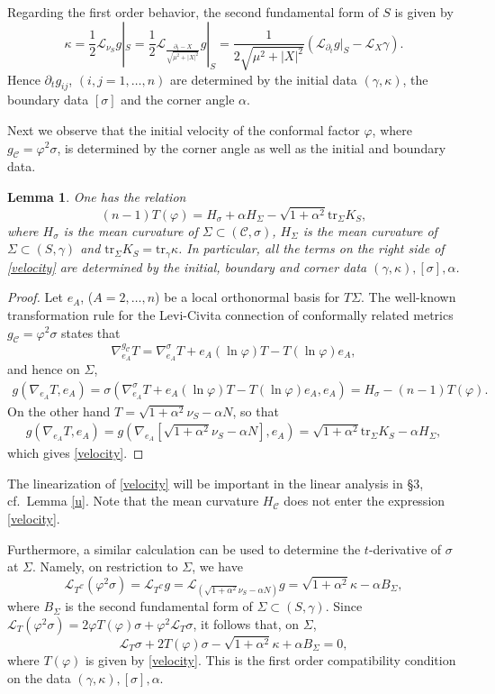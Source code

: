 \documentclass[10pt]{amsart}
\renewcommand{\a}{\alpha}
\newcommand{\g}{\gamma}
\newcommand{\f}{\varphi}
\newcommand{\s}{\sigma}
\newcommand{\Si}{\Sigma}
\renewcommand{\k}{\kappa}
\newcommand{\cC}{{\mathcal C}}
\newcommand{\cL}{{\mathcal L}}
\newcommand{\be}{\begin{equation}}
\newcommand{\ee}{\end{equation}}
\newcommand{\bes}{\begin{equation*}}
\newcommand{\ees}{\end{equation*}}
\newcommand{\tr}{\mathrm{tr}}
\newcommand{\p}{\partial}
\newcommand{\<}{\langle}
\renewcommand{\>}{\rangle}
\theoremstyle{plain}
\newtheorem{lemma}{Lemma}[section]
\theoremstyle{remark}
\theoremstyle{definition}
\numberwithin{equation}{section}
\begin{document}
\medskip

Regarding the first order behavior, the second fundamental form of $S$ is given by  
\be\label{pt-K}
\k = \frac{1}{2}\cL_{\nu_S} g|_S=\frac{1}{2}\cL_{\frac{\p_t-X}{\sqrt{\mu^2+|X|^2}}}g|_S=\frac{1}{2\sqrt{\mu^2+|X|^2}}(\cL_{\p_{t}}g|_S-\cL_{X}\g).
\ee
Hence $\p_t g_{ij}$, $(i, j =1, \dots, n)$ are determined by the initial data $(\g, \k)$, the boundary data $[\s]$ and the corner angle $\a$. 
 
 Next we observe that the initial velocity of the conformal factor $\f$, where $g_{\cC} = \f^2 \s$, is determined by the corner angle as well as the initial and 
boundary data. 

\begin{lemma} \label{cornerlemma}
One has the relation
\be \label{velocity}
(n-1)T(\f) = H_{\s} + \a H_{\Si} - \sqrt{1+\a^2}\tr_\Si K_S, 
\ee 
where $H_\s$ is the mean curvature of $\Si\subset (\cC,\s)$, $H_{\Si}$ is the mean curvature of $\Si \subset (S, \g)$ and 
$\tr_{\Si}K_S = \tr_{\g}\k$. In particular, all the terms on the right side of \eqref{velocity} are determined by the initial, boundary and 
corner data $(\g, \k), [\s], \a$. 
\end{lemma}

\begin{proof}

Let $e_A$, ($A = 2, \dots, n$) be a local orthonormal basis for $T\Si$. The well-known transformation rule for the Levi-Civita connection of 
conformally related metrics $g_\cC=\f^2\s$ states that 
\bes
\nabla^{g_{\cC}}_{e_A}T = \nabla^\s_{e_A}T + e_A(\ln \f)T - T(\ln \f)e_A,
\ees
and hence on $\Si$,  
\bes
\begin{split}
g(\nabla_{e_A}T, e_A) = \s(\nabla^\s_{e_A}T + e_A(\ln \f)T - T(\ln \f)e_A, e_A) = H_\s - (n-1)T(\f) .
\end{split}
\ees
On the other hand $T = \sqrt{1+\a^2}\nu_S-\a N$, so that 
\bes
\begin{split}
g(\nabla_{e_A}T,e_A)=g(\nabla_{e_A}[\sqrt{1+\a^2}\nu_S-\a N], e_A)=\sqrt{1+\a^2}\tr_\Si K_S - \a H_\Si,
\end{split}
\ees
which gives \eqref{velocity}. 
\end{proof}

The linearization of \eqref{velocity} will be important in the linear analysis in \S 3, cf.~Lemma \ref{u}. Note that the mean curvature $H_{\cC}$ does not enter 
the expression \eqref{velocity}. 


Furthermore, a similar calculation can be used to determine the $t$-derivative of $\s$ at $\Si$. Namely, on restriction to $\Si$, we have  
$$\cL_{T^{\cC}}(\f^2 \s) = \cL_{T^{\cC}}g = \cL_{(\sqrt{1+\a^2}\nu_S - \a N)}g = \sqrt{1+\a^2}\k - \a B_{\Si},$$
where $B_{\Si}$ is the second fundamental form of $\Si \subset (S,\g)$. Since $\cL_{T}(\f^2 \s) = 2\f T(\f)\s + \f^2\cL_{T}\s$, it 
follows that, on $\Si$, 
\be \label{C3}
\cL_{T} \s + 2T(\f) \s - \sqrt{1+\a^2}\k  + \a B_{\Si} = 0,
\ee 
where $T(\f)$ is given by \eqref{velocity}. This is the first order compatibility condition on the data $(\g,\k), [\s], \a$. 
\end{document}
